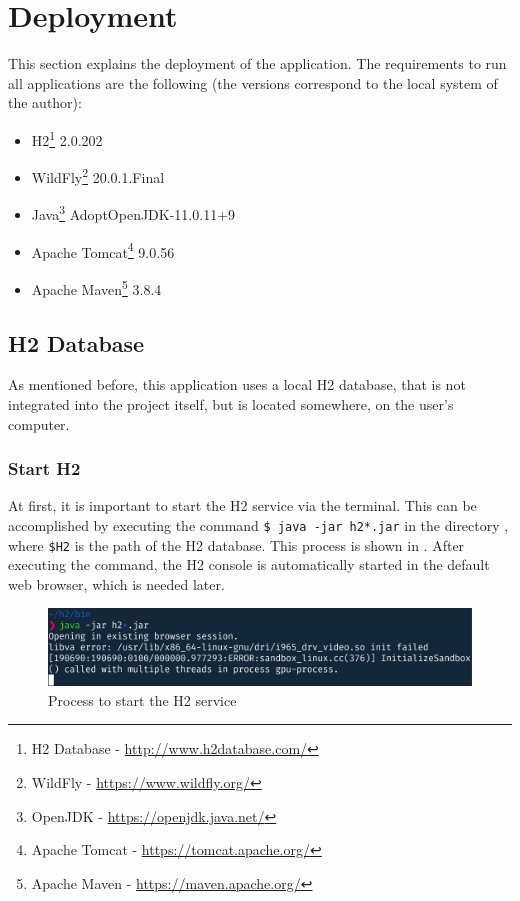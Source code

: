 \newpage
\section{Deployment}\label{sec:03_depl}
This section explains the deployment of the application.
The requirements to run all applications are the following (the versions correspond to the local system of the author):
\begin{itemize}
\item H2\footnote{H2 Database - \url{http://www.h2database.com/}} 2.0.202
\item WildFly\footnote{WildFly - \url{https://www.wildfly.org/}} 20.0.1.Final
\item Java\footnote{OpenJDK - \url{https://openjdk.java.net/}} AdoptOpenJDK-11.0.11+9
\item Apache Tomcat\footnote{Apache Tomcat - \url{https://tomcat.apache.org/}} 9.0.56
\item Apache Maven\footnote{Apache Maven - \url{https://maven.apache.org/}} 3.8.4
\end{itemize}


\subsection{H2 Database}\label{sec:03_depl_h2}
As mentioned before, this application uses a local H2 database, that is not integrated into the project itself, but is located somewhere, on the user's computer.

\subsubsection{Start H2}\label{sec:03_depl_h2_start}
At first, it is important to start the H2 service via the terminal. This can be accomplished by executing the command \texttt{\$ java -jar h2*.jar} in the directory , where \texttt{\$H2} is the path of the H2 database. This process is shown in . After executing the command, the H2 console is automatically started in the default web browser, which is needed later.
\begin{figure}[h]
\centering
\includegraphics[scale=0.23]{images/03_depl/h2_start}
\caption{Process to start the H2 service}
\label{fig:03_depl_h2_h2start}
\end{figure}

